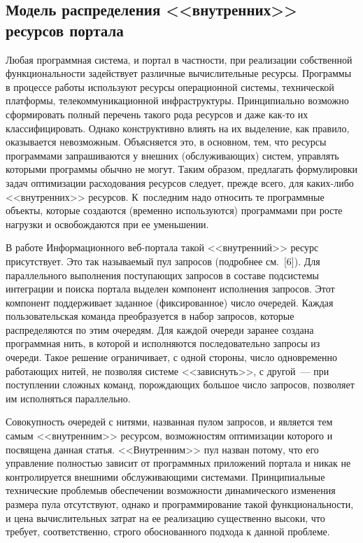 \begin{multicols}{2}
\section{Модель распределения <<внутренних>> ресурсов портала}
  
  Любая программная система, и портал в частности, при реализации собственной 
функциональности задействует различные вычислительные ресурсы. Программы в процессе 
работы используют ресурсы операционной системы, технической платформы, 
телекоммуникационной инфраструктуры. Принципиально возможно сформировать полный 
перечень такого рода ресурсов и даже как-то их классифицировать. Однако конструктивно 
влиять на их выделение, как правило, оказывается невозможным. Объясняется это, в 
основном, тем, что ресурсы программами запрашиваются у внешних (обслуживающих) 
систем, управлять которыми программы обычно не могут. Таким образом, предлагать 
формулировки задач оптимизации расходования ресурсов следует, прежде всего, для 
  каких-либо <<внутренних>> ресурсов. К~последним надо относить те программные 
объекты, которые создаются (временно используются) программами при росте нагрузки и 
освобождаются при ее уменьшении.
  
  В работе Информационного веб-портала такой <<внутренний>> ресурс присутствует. Это 
так называемый пул запросов (подробнее см.~[6]). Для параллельного выполнения 
поступающих запросов в составе подсистемы интеграции и поиска портала выделен 
компонент исполнения запросов. Этот компонент поддерживает заданное (фиксированное) 
число очередей. Каждая пользовательская команда преобразуется в набор запросов, которые 
распределяются по этим очередям. Для каждой очереди заранее создана программная нить, в 
которой и исполняются последовательно запросы из очереди. Такое решение ограничивает, с 
одной стороны, чис\-ло одновременно работающих нитей, не позволяя системе 
<<зависнуть>>, с другой~--- при поступлении сложных команд, порождающих большое 
число запросов, позволяет им исполняться параллельно.
  
  Совокупность очередей с нитями, названная пулом запросов, и является тем самым 
<<внутренним>> ресурсом, возможностям оптимизации которого и посвящена данная 
статья. <<Внутренним>> пул назван потому, что его управление полностью зависит от 
программных приложений портала и никак не контролируется внешними обслуживающими 
сис\-те\-ма\-ми. Принципиальные технические проблемы\linebreak в обеспечении возможности 
динамического из\-ме\-нения размера пула отсутствуют, однако и программирование такой 
функциональности, и цена вы\-чис\-ли\-тель\-ных затрат на ее реализацию существенно высоки, 
что требует, соответственно, строго обосно\-ван\-но\-го подхода к данной проблеме.
  

\end{multicols}
